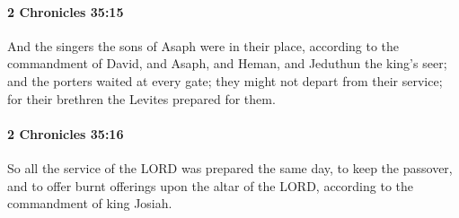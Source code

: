 		\paragraph{2 Chronicles 35:15} %
			\label{2CHRONICLES-35-15}

			And the singers the sons of Asaph were in their place, according to the commandment of David, and Asaph, and Heman, and Jeduthun the king's seer; and the porters waited at every gate; they might not depart from their service; for their brethren the Levites prepared for them.


		\paragraph{2 Chronicles 35:16} %
			\label{2CHRONICLES-35-16}

			So all the service of the LORD was prepared the same day, to keep the passover, and to offer burnt offerings upon the altar of the LORD, according to the commandment of king Josiah.

